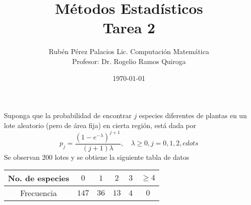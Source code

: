 \documentclass[letterpaper]{article}
\title{Métodos Estadísticos \\ Tarea 2}
\author{Rubén Pérez Palacios Lic. Computación Matemática\\Profesor: Dr. Rogelio Ramos Quiroga}
\date{\today}
\theoremstyle{definition}
\theoremstyle{lemathm}
\theoremstyle{lemathm}
\theoremstyle{lemathm}
\theoremstyle{lemademthm}
\newcommand{\pars}[1]{\left( #1 \right) }
\newcommand{\1}{\mathbbm{1}}
\begin{document}
	\maketitle
	Suponga que la probabilidad de encontrar $j$ especies diferentes de plantas en un lote aleatorio (pero de área fija) en cierta región, está dada por
	\[p_j = \frac{\pars{1-e^{-\lambda}}^{j+1}}{\pars{j+1}\lambda}, \quad \lambda \geq 0, j = 0,1,2,cdots\]
	Se observan 200 lotes y se obtiene la siguiente tabla de datos
	\begin{center}
		\begin{tabular}{|c|ccccc|}
			\hline
			No. de especies & $0$ & $1$ & $2$ & $3$ & $\geq 4$\\
			\hline
			Frecuencia & $147$ & $36$ & $13$ & $4$ & $0$\\
			\hline
		\end{tabular}
	\end{center}
\end{document}
